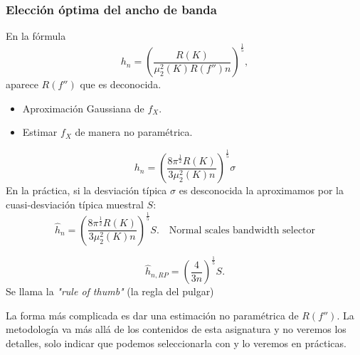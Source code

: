 \subsubsection{Elección óptima del ancho de banda}
En la fórmula \[
h_n=\left( \dfrac{R(K)}{\mu_2^2(K)R(f'')n} \right) ^{\frac{1}{5} },
\] aparece $R(f'')$ que es deconocida.
 \begin{tcolorbox}[colback=red!5!white, colframe=red!75!black, title=\textbf{Veremos dos maneras de aproximar $R(f'')$:}]
 \begin{itemize}[label=\textbullet]
     \item Aproximación Gaussiana de $f_X$.
     \item Estimar $f_X$ de manera no paramétrica.
 \end{itemize}
 \end{tcolorbox}
 \begin{tcolorbox}[colback=blue!5!white, colframe=blue!75!black, title=\textbf{Suponemos que $f$ es la función de densidad de una distribución normal con desviación típica $\sigma$:}]
 \[
 h_n=\left( \dfrac{8\pi^{\frac{1}{2} }R(K)}{3\mu_2^2(K)n} \right) ^{\frac{1}{5} }\sigma
 \] 
 En la práctica, si la desviación típica $\sigma$ es desconocida la aproximamos por la cuasi-desviación típica muestral $S$: \[
 \hat{h}_n=\left( \dfrac{8\pi^{\frac{1}{2} }R(K)}{3\mu_2^2(K)n} \right) ^{\frac{1}{5} }S.\quad \text{Normal scales bandwidth selector}
 \] 
 \end{tcolorbox}
 \begin{tcolorbox}[colback=blue!5!white, colframe=blue!75!black, title=\textbf{Si además consideramos que el núcleo $K$ es gaussiano:}]
 \[
 \hat{h}_{n,RP}=\left( \dfrac{4}{3n} \right) ^{\frac{1}{5} }S.
 \] 
 Se llama la \textit{"rule of thumb"} (la regla del pulgar)
 \end{tcolorbox}
 La forma más complicada es dar una estimación no paramétrica de $R(f'')$. La metodología va más allá de los contenidos de esta asignatura y no veremos los detalles, solo indicar que podemos seleccionarla con   y lo veremos en prácticas.

